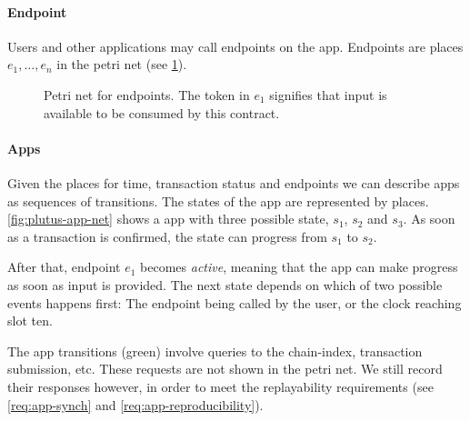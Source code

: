 \paragraph{Endpoint}

Users and other applications may call endpoints on the \gls{app}.
Endpoints are places $e_1, \ldots, e_n$ in the petri net (see \ref{fig:petri-net-endpoint}).

\begin{figure}
  \centering
\caption{Petri net for endpoints. The token in $e_1$ signifies that input is available to be consumed by this contract.}
\label{fig:petri-net-endpoint}
\end{figure}

\paragraph{Apps}

Given the places for time, transaction status and endpoints we can describe \glspl{app} as sequences of transitions.
The states of the app are represented by places.
\ref{fig:plutus-app-net} shows a \gls{app} with three possible state, $s_1$, $s_2$ and $s_3$.
As soon as a transaction is confirmed, the state can progress from $s_1$ to $s_2$.

After that, endpoint $e_1$ becomes \emph{active}, meaning that the app can make progress as soon as input is provided. The next state depends on which of two possible events happens first: The endpoint being called by the user, or the clock reaching slot ten.

The app transitions (green) involve queries to the \gls{chain-index}, transaction submission, etc.
These requests are not shown in the petri net.
We still record their responses however, in order to meet the replayability requirements (see \ref{req:app-synch} and \ref{req:app-reproducibility}).

